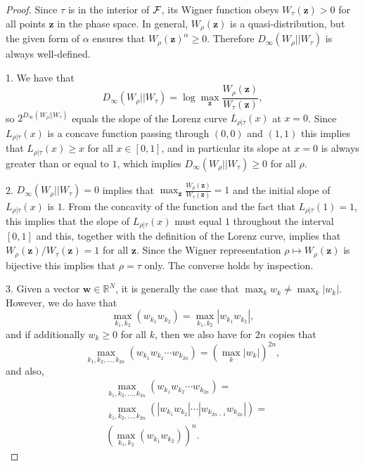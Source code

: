 \documentclass[
twocolumn,
superscriptaddress
]{revtex4-1}
\def\z{\boldsymbol{z}}
\def\w{\boldsymbol{w}}
\def\F{{\cal F}}
\begin{document}
\begin{proof}
	Since $\tau$ is in the interior of $\F$, its Wigner function obeys $W_\tau(\z) >0$ for all points $\z$ in the phase space. 
In general, $W_\rho(\z)$ is a quasi-distribution, but the given form of $\alpha$ ensures that $W_{\rho}(\z)^\alpha \geq 0$. 
Therefore $D_\infty (W_\rho || W_\tau)$ is always well-defined.

1. We have that 
\begin{equation}
	D_\infty(W_\rho || W_\tau) =\log  \max_{\z} \frac{W_\rho(\z)}{W_\tau(\z)},
\end{equation}
so $2^{D_\infty(W_\rho || W_\tau)}$ equals the slope of the Lorenz curve $L_{\rho|\tau}(x)$ at $x=0$. Since $L_{\rho|\tau}(x)$ is a concave function passing through $(0,0)$ and $(1,1)$ this implies that $L_{\rho |\tau}(x) \ge x$ for all $x \in [0,1]$, and in particular its slope at $x=0$ is always greater than or equal to $1$, which implies $D_\infty(W_\rho || W_\tau) \geq 0$ for all $\rho$.

2. $D_\infty(W_\rho || W_\tau) = 0$ implies that $\max_{\z} \frac{W_\rho(\z)}{W_\tau(\z)}=1$ and the initial slope of $L_{\rho|\tau}(x)$ is $1$. From the concavity of the function and the fact that $L_{\rho|\tau}(1)=1$, this implies that the slope of $L_{\rho|\tau}(x)$ must equal $1$ throughout the interval $[0,1]$ and this, together with the definition of the Lorenz curve, implies that $W_\rho(\z)/W_\tau(\z) = 1$ for all $\z$. Since the Wigner representation $\rho \mapsto W_\rho(\z)$ is bijective this implies that $\rho = \tau$ only. The converse holds by inspection.

3. Given a vector $\w \in \mathbb{R}^N$, it is generally the case that $\max_k w_k \ne \max_k |w_k|$. 
However, we do have that
\begin{equation}
	\max_{k_1,k_2} (w_{k_1} w_{k_2}) = \max_{k_1,k_2} |w_{k_1} w_{k_2}|,
\end{equation}
and if additionally $w_k \geq 0$ for all $k$, then we also have for $2n$ copies that
\begin{equation}
	\max_{k_1, k_2, \dots, k_{2n}} \left( w_{k_1}w_{k_2}\cdots w_{k_{2n}} \right) = (\max_k |w_k|)^{2n},
\end{equation}
and also,
\begin{align}
	&\max_{k_1, k_2, \dots, k_{2n}}\left( w_{k_1}w_{k_2}\cdots w_{k_{2n}} \right) = \nonumber\\
	&\max_{k_1, k_2, \dots, k_{2n}}\left( |w_{k_1}w_{k_2}|\cdots |w_{k_{2n-1}}w_{k_{2n}}| \right) = \nonumber \\
	&\left( \max_{k_1 ,k_2}\left( w_{k_1} w_{k_2} \right) \right)^n.
\end{align}


\end{proof}
\end{document}
